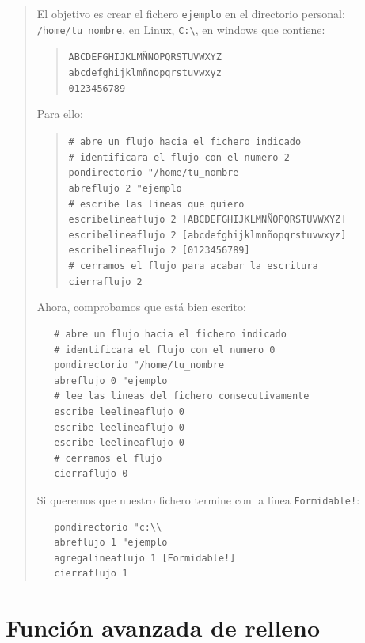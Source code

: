 \begin{quote}
   El objetivo es crear el fichero \texttt{ejemplo} en el directorio
   personal: \texttt{/home/tu\_nombre}, en Linux, \texttt{C:\textbackslash{}},
   en windows que contiene:
   \begin{quote}
      \texttt{ABCDEFGHIJKLM\~NNOPQRSTUVWXYZ}\\
      \texttt{abcdefghijklm\~nnopqrstuvwxyz}\\
      \texttt{0123456789}
   \end{quote}
   Para ello:
   \begin{quote}
      \verb+# abre un flujo hacia el fichero indicado+\\
      \verb+# identificara el flujo con el numero 2+\\
      \verb+pondirectorio "/home/tu_nombre+\\
      \verb+abreflujo 2 "ejemplo+\\
      \verb+# escribe las lineas que quiero+\\
      \texttt{escribelineaflujo 2 [ABCDEFGHIJKLMN\~NOPQRSTUVWXYZ]}\\
      \texttt{escribelineaflujo 2 [abcdefghijklmn\~nopqrstuvwxyz]}\\
      \verb+escribelineaflujo 2 [0123456789]+\\
      \verb+# cerramos el flujo para acabar la escritura+\\
      \verb+cierraflujo 2+ \end{quote}
   Ahora, comprobamos que est\'a bien escrito:
   \begin{verbatim}
   # abre un flujo hacia el fichero indicado
   # identificara el flujo con el numero 0
   pondirectorio "/home/tu_nombre
   abreflujo 0 "ejemplo
   # lee las lineas del fichero consecutivamente
   escribe leelineaflujo 0
   escribe leelineaflujo 0
   escribe leelineaflujo 0
   # cerramos el flujo
   cierraflujo 0 \end{verbatim}
   Si queremos que nuestro fichero termine con la l\'inea
   \texttt{Formidable!}:
   \begin{verbatim}
   pondirectorio "c:\\
   abreflujo 1 "ejemplo
   agregalineaflujo 1 [Formidable!]
   cierraflujo 1 \end{verbatim}
\end{quote}

\section{Funci\'on avanzada de relleno}
   \label{Funcion-Relleno}

